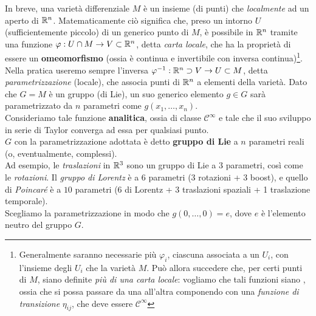 \documentclass[../../FisicaTeorica.tex]{subfiles}
\begin{document}
In breve, una varietà differenziale $M$ è un insieme (di punti) che \textit{localmente}  ad un aperto di $\mathbb{R}^n$. Matematicamente ciò significa che, preso un intorno $U$ (sufficientemente piccolo) di un generico punto di $M$, è possibile  in $\mathbb{R}^n$ tramite una funzione $\varphi: U\cap M \to V \subset \mathbb{R}^n$, detta \textit{carta locale}, che ha la proprietà di essere un \textbf{omeomorfismo} (ossia è continua e invertibile con inversa continua)\footnote{Generalmente saranno necessarie più $\varphi_i$, ciascuna associata a un $U_i$, con l'insieme degli $U_i$ che  la varietà $M$. Può allora succedere che, per certi punti di $M$, siano definite \textit{più di una carta locale}: vogliamo che tali funzioni siano , ossia che si possa passare da una all'altra componendo con una \textit{funzione di transizione} $\eta_{ij}$, che deve essere $\mathcal{C}^\infty$}.\\
Nella pratica useremo sempre l'inversa $\varphi^{-1}:\mathbb{R}^n \supset V \to U \subset M$, detta \textit{parametrizzazione} (locale), che associa punti di $\mathbb{R}^n$ a elementi della varietà. Dato che $G=M$ è un gruppo (di Lie), un suo generico elemento $g\in G$ sarà parametrizzato da $n$ parametri come $g(x_1, \dots, x_n)$.\\
Consideriamo tale funzione \textbf{analitica}, ossia di classe $\mathcal{C}^\infty$ e tale che il suo sviluppo in serie di Taylor converga ad essa per qualsiasi punto.\\
$G$ con la parametrizzazione adottata è detto \textbf{gruppo di Lie} a $n$ parametri reali (o, eventualmente, complessi).\\
Ad esempio, le \textit{traslazioni} in $\mathbb{R}^3$ sono un gruppo di Lie a $3$ parametri, così come le \textit{rotazioni}. Il \textit{gruppo di Lorentz} è a $6$ parametri (3 rotazioni + 3 boost), e quello di \textit{Poincaré} è a $10$ parametri (6 di Lorentz + 3 traslazioni spaziali + 1 traslazione temporale).\\

Scegliamo la parametrizzazione in modo che $g(0,\dots,0)=e$, dove $e$ è l'elemento neutro del gruppo $G$.\\

\end{document}
